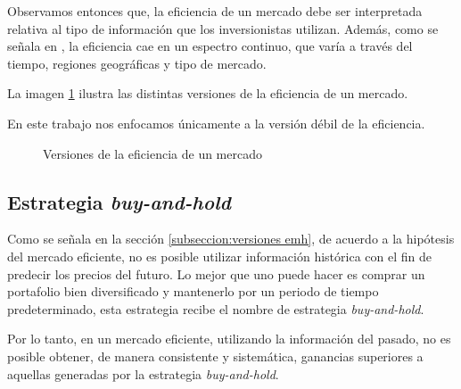 \documentclass[12pt]{scrbook}
\theoremstyle{break}
\theoremstyle{break}
\newcommand{\buyhold}{\textit{buy-and-hold}}
\begin{document}
Observamos entonces que, la eficiencia de un mercado debe ser interpretada relativa al tipo de información que los inversionistas utilizan. Además, como se señala en \cite{CFA2019}, la eficiencia cae en un espectro continuo, que varía a través del tiempo, regiones geográficas y tipo de mercado.

La imagen \ref{imagen:versiones emh} ilustra las distintas versiones de la eficiencia de un mercado.

En este trabajo nos enfocamos únicamente a la versión débil de la eficiencia.

\begin{figure}[ht]
\centering
{}
\caption{\label{imagen:versiones emh} Versiones de la eficiencia de un mercado}
\end{figure}


\subsection{Estrategia \buyhold}
\label{seccion:buy and hold}
Como se señala en la sección \ref{subseccion:versiones emh}, de acuerdo a la hipótesis del mercado eficiente, no es posible utilizar información histórica con el fin de predecir los precios del futuro. Lo mejor que uno puede hacer es comprar un portafolio bien diversificado y mantenerlo por un periodo de tiempo predeterminado, esta estrategia recibe el nombre de estrategia \buyhold.

Por lo tanto, en un mercado eficiente, utilizando la información del pasado, no es posible obtener, de manera consistente y sistemática, ganancias superiores a aquellas generadas por la estrategia \buyhold.
\end{document}
